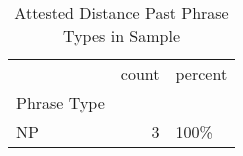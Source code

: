 \begin{table}[htbp!]
\centering
\caption{Attested Distance Past Phrase Types in Sample}
\label{table:distpast_phtype_ct}
\begin{tabular}{lrl}
\toprule
{} &  count & percent \\
Phrase Type &        &         \\
\midrule
NP          &      3 &    100\% \\
\bottomrule
\end{tabular}
\end{table}
